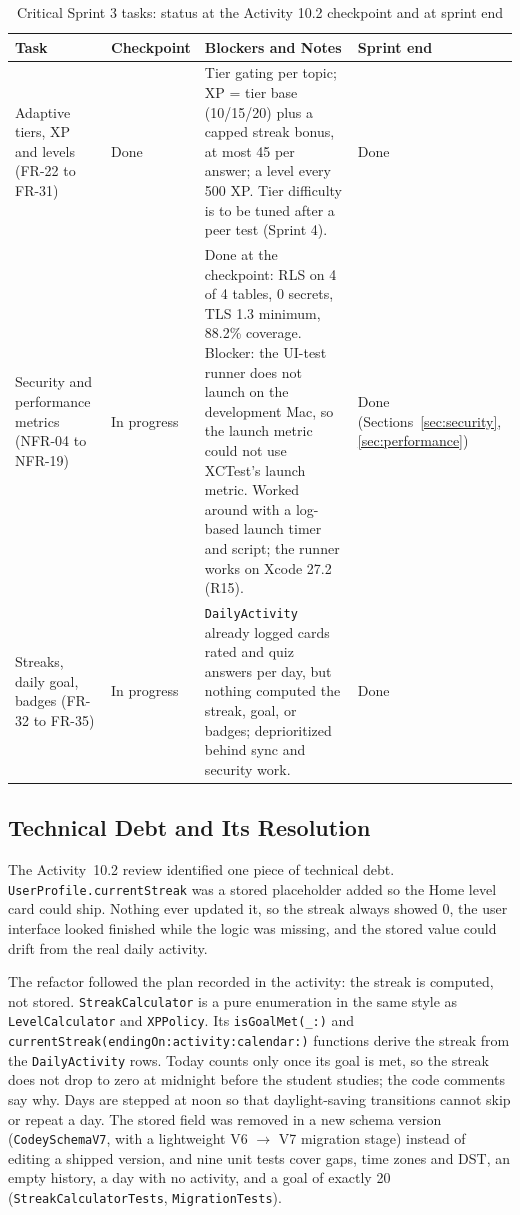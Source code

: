 \documentclass[12pt,letterpaper]{article}
\begin{document}
\begin{table}[H]
\centering
\caption{Critical Sprint 3 tasks: status at the Activity 10.2 checkpoint and at sprint end}
\label{tab:status}
\begin{tabularx}{\textwidth}{@{}L{3.0cm} L{2.2cm} Y L{1.9cm}@{}}
\toprule
\textbf{Task} & \textbf{Checkpoint} & \textbf{Blockers and Notes} & \textbf{Sprint end} \\
\midrule
Adaptive tiers, XP and levels (FR-22 to FR-31) & Done & Tier gating per topic; XP = tier base (10/15/20) plus a capped streak bonus, at most 45 per answer; a level every 500 XP. Tier difficulty is to be tuned after a peer test (Sprint 4). & Done \\
Security and performance metrics (NFR-04 to NFR-19) & In progress & Done at the checkpoint: RLS on 4 of 4 tables, 0 secrets, TLS 1.3 minimum, 88.2\% coverage. Blocker: the UI-test runner does not launch on the development Mac, so the launch metric could not use XCTest's launch metric. Worked around with a log-based launch timer and script; the runner works on Xcode 27.2 (R15). & Done (Sections~\ref{sec:security}, \ref{sec:performance}) \\
Streaks, daily goal, badges (FR-32 to FR-35) & In progress & \texttt{DailyActivity} already logged cards rated and quiz answers per day, but nothing computed the streak, goal, or badges; deprioritized behind sync and security work. & Done \\
\bottomrule
\end{tabularx}
\end{table}

\subsection{Technical Debt and Its Resolution}
The Activity~10.2 review identified one piece of technical debt.
\texttt{UserProfile.currentStreak} was a stored placeholder added so the Home level
card could ship. Nothing ever updated it, so the streak always showed 0, the user
interface looked finished while the logic was missing, and the stored value could
drift from the real daily activity.

The refactor followed the plan recorded in the activity: the streak is computed, not
stored. \texttt{StreakCalculator} is a pure enumeration in the same style as
\texttt{LevelCalculator} and \texttt{XPPolicy}. Its \texttt{isGoalMet(\_:)} and
\texttt{currentStreak(endingOn:activity:calendar:)} functions derive the streak from
the \texttt{DailyActivity} rows. Today counts only once its goal is met, so the streak
does not drop to zero at midnight before the student studies; the code comments say
why. Days are stepped at noon so that daylight-saving transitions cannot skip or repeat
a day. The stored field was removed in a new schema version (\texttt{CodeySchemaV7},
with a lightweight V6 $\to$ V7 migration stage) instead of editing a shipped version,
and nine unit tests cover gaps, time zones and DST, an empty history, a day with no
activity, and a goal of exactly 20 (\texttt{StreakCalculatorTests},
\texttt{MigrationTests}).
\end{document}
